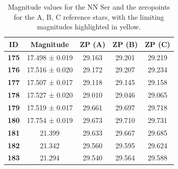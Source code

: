 \documentclass[11pt, a4paper, twocolumn]{article}
\begin{document}
\begin{table}[H]
\centering
\caption{Magnitude values for the NN Ser and the zeropoints for the A, B, C reference stars, with the limiting magnitudes highlighted in yellow.}
\label{tab:1}
\begin{tabular}{|
>{\columncolor[HTML]{C0C0C0}}c |c|c|c|c|}
\hline
\textbf{ID}  & \cellcolor[HTML]{C0C0C0}\textbf{Magnitude} & \cellcolor[HTML]{C0C0C0}\textbf{ZP (A)} & \cellcolor[HTML]{C0C0C0}\textbf{ZP (B)} & \cellcolor[HTML]{C0C0C0}\textbf{ZP (C)} \\ \hline
\textbf{175} & 17.498 ± 0.019                             & 29.163                                  & 29.201                                  & 29.219                                  \\ \hline
\textbf{176} & 17.516 ± 0.020                             & 29.172                                  & 29.207                                  & 29.234                                  \\ \hline
\textbf{177} & 17.507 ± 0.017                             & 29.118                                  & 29.145                                  & 29.158                                  \\ \hline
\textbf{178} & 17.527 ± 0.020                             & 29.010                                  & 29.046                                  & 29.065                                  \\ \hline
\textbf{179} & 17.519 ± 0.017                             & 29.661                                  & 29.697                                  & 29.718                                  \\ \hline
\textbf{180} & 17.754 ± 0.019                             & 29.673                                  & 29.710                                  & 29.731                                  \\ \hline
\textbf{181} & \cellcolor[HTML]{FFFE65}21.399             & 29.633                                  & 29.667                                  & 29.685                                  \\ \hline
\textbf{182} & \cellcolor[HTML]{FFFE65}21.342             & 29.560                                  & 29.595                                  & 29.624                                  \\ \hline
\textbf{183} & \cellcolor[HTML]{FFFE65}21.294             & 29.540                                  & 29.564                                  & 29.588                                  \\ \hline

\end{tabular}
\end{table}
\end{document}
